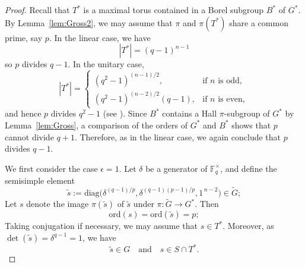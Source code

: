 \documentclass[12pt]{amsart}
\theoremstyle{definition}
\numberwithin{equation}{section}
\newcommand{\ord}{{\mathrm {ord}}}
\newcommand{\diag}{{\mathrm {diag}}}
\newcommand{\FF}{{\mathbb F}}
\begin{document}
\begin{proof}
Recall that $T^*$ is a maximal torus contained in a Borel subgroup
$B^*$ of $G^*$. By Lemma~\ref{lem:Gross2}, we may assume that $\pi$
and $\pi(T^*)$ share a common prime, say $p$. In the linear case, we
have
\[
|T^*| = (q-1)^{n-1}
\]
so %
$p$ divides $q-1$. In the unitary %
case,
\[
|T^*| =
\begin{cases}
(q^2-1)^{(n-1)/2}, & \text{if $n$ is odd},\\[2pt]
(q^2-1)^{(n-2)/2}(q-1), & \text{if $n$ is even},
\end{cases}
\]
and %
hence $p$ divides $q^2-1$ (see \cite[p.~74]{Carter85}). Since
$B^*$ contains a Hall $\pi$-subgroup of $G^*$ by
Lemma~\ref{lem:Gross}, a comparison of the orders of $G^*$ and $B^*$
shows that $p$ cannot divide $q+1$. Therefore, as in the linear
case, we again conclude that $p$ divides $q-1$.



We first consider the case $\epsilon=1$. Let $\delta$ be a generator
of $\FF_{q}^\times$, and define the semisimple %
element
\[
\widetilde{s} := \diag\!\bigl( \delta^{(q-1)/p},
\delta^{(q-1)(p-1)/p}, 1^{\,n-2} \bigr) \in \widetilde{G};
\]
Let %
$s$ denote the image $\pi(\widetilde{s})$ of $\widetilde{s}$
under $\pi:\widetilde{G}\to G^*$. %
Then
\[
\ord(s) = \ord(\widetilde{s}) = p;
\]
Taking %
conjugation if necessary, we may assume that $s\in T^*$.
Moreover, as $\det(\widetilde{s})=\delta^{q-1}=1$, we have
\[
\widetilde{s}\in G \quad\text{and}\quad s\in S\cap T^*.
\]


\end{proof}
\end{document}
